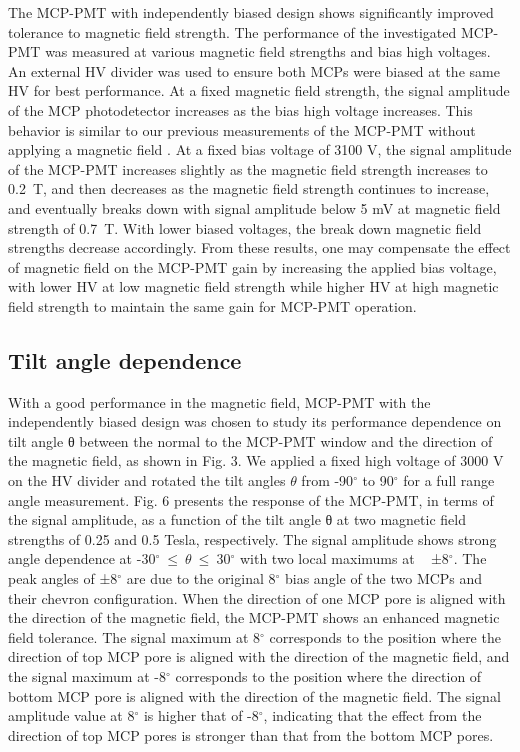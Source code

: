 ﻿\documentclass[preprint,5p]{elsarticle}
\begin{document}
The MCP-PMT with independently biased design shows significantly improved 
tolerance to magnetic field strength. The performance of the investigated 
MCP-PMT was measured at various magnetic field strengths and bias high 
voltages. An external HV divider was used to ensure both MCPs were biased at 
the same HV for best performance. At a fixed magnetic field strength, the 
signal amplitude of the MCP photodetector increases as the bias high voltage 
increases. This behavior is similar to our previous measurements of the MCP-PMT 
without applying a magnetic field \cite{21}. At a fixed bias voltage of 3100 V, 
the signal amplitude of the MCP-PMT increases slightly as the magnetic field 
strength increases to 0.2~T, and then decreases as the magnetic field strength 
continues to increase, and eventually breaks down with signal amplitude below 5 
mV at magnetic field strength of 0.7~T. With lower biased voltages, the break 
down magnetic field strengths decrease accordingly. From these results, one may 
compensate the effect of magnetic field on the MCP-PMT gain by increasing the 
applied bias voltage, with lower HV at low magnetic field strength while higher 
HV at high magnetic field strength to maintain the same gain for MCP-PMT 
operation. 



\subsection{Tilt angle dependence} \label{}
With a good performance in the magnetic field, MCP-PMT with the independently 
biased design was chosen to study its performance dependence on tilt angle θ 
between the normal to the MCP-PMT window and the direction of the magnetic 
field, as shown in Fig. 3. We applied a fixed high voltage of 3000 V on the HV 
divider and rotated the tilt angles $\theta$ from -90$^{\circ}$ to 90$^{\circ}$ 
for a full range angle measurement. Fig. 6 presents the response of the 
MCP-PMT, in terms of the signal amplitude, as a function of the tilt angle θ at 
two magnetic field strengths of 0.25 and 0.5 Tesla, respectively.  The signal 
amplitude shows strong angle dependence at 
-30$^{\circ}~\leq~\theta~\leq~$30$^{\circ}$ with two local maximums at ~ 
±8$^{\circ}$.  The peak angles of ±8$^{\circ}$ are due to the original 
8$^{\circ}$ bias angle of the two MCPs and their chevron configuration.  When 
the direction of one MCP pore is aligned with the direction of the magnetic 
field, the MCP-PMT shows an enhanced magnetic field tolerance. The signal 
maximum at 8$^{\circ}$ corresponds to the position where the direction of top 
MCP pore is aligned with the direction of the magnetic field, and the signal 
maximum at -8$^{\circ}$ corresponds to the position where the direction of 
bottom MCP pore is aligned with the direction of the magnetic field. The signal 
amplitude value at 8$^{\circ}$ is higher that of -8$^{\circ}$, indicating that 
the effect from the direction of top MCP pores is stronger than that from the 
bottom MCP pores.
\end{document}
